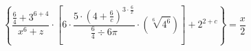 \documentclass[11pt,a4paper]{book}
\begin{document}
$$
\left\{\frac{\frac{6}{4}+3^{6+4}}{x^6+z}\cdot \left[6\cdot \frac{5\cdot \left(4+\frac{6}{c}\right)^{3\cdot \frac{6}{x}}}{\frac{6}{4}\div 6\pi }\cdot \left(\sqrt[6]{4^6}\right)\right]+2^{2+c}\right\}=\frac{x}{2}
$$
\end{document}
